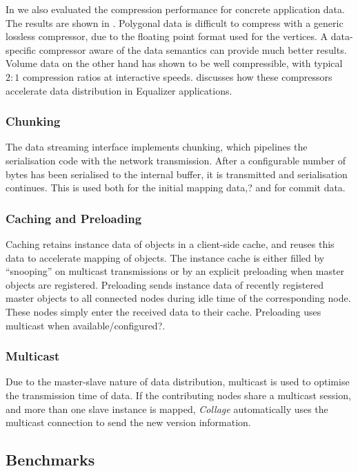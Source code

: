 In \cite{ESP:18} we also evaluated the compression performance for concrete
application data. The results are shown in . Polygonal
data is difficult to compress with a generic lossless compressor, due to the
floating point format used for the vertices. A data-specific compressor aware
of the data semantics can provide much better results. Volume data on the other
hand has shown to be well compressible, with typical $2:1$ compression ratios
at interactive speeds.  discusses how these compressors
accelerate data distribution in Equalizer applications.

\subsubsection{Chunking}

The data streaming interface implements chunking, which pipelines the
serialisation code with the network transmission. After a configurable number of
bytes has been serialised to the internal buffer, it is transmitted and
serialisation continues. This is used both for the initial mapping data,? and for
commit data.

\subsubsection{Caching and Preloading}

Caching retains instance data of objects in a client-side cache, and reuses
this data to accelerate mapping of objects. The instance cache is either filled
by ``snooping'' on multicast transmissions or by an explicit preloading when
master objects are registered. Preloading sends instance data of recently
registered master objects to all connected nodes during idle time of the
corresponding node. These nodes simply enter the received data to their cache.
Preloading uses multicast when available/configured?.

\subsubsection{Multicast}

Due to the master-slave nature of data distribution, multicast is used to
optimise the transmission time of data. If the contributing nodes share a
multicast session, and more than one slave instance is mapped, {\em Collage}
automatically uses the multicast connection to send the new version
information.

\subsection{Benchmarks}\label{sObjectBench}

